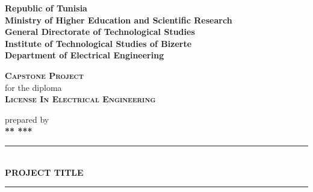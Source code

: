 \begin{titlepage}
    \newcommand{\HRule}{\rule{\linewidth}{0.35mm}}
    \begin{flushleft}
        {\scriptsize
            \textbf{\large{Republic of Tunisia}}\\
            \textbf{\large{Ministry of Higher Education and Scientific Research}}\\
            \textbf{\large{General Directorate of Technological Studies}}\\
            \textbf{\large{Institute of Technological Studies of Bizerte}}\\
            \textbf{\large{Department of Electrical Engineering}}}
    \end{flushleft}
    \begin{center}
        \textbf{\textsc{\huge{Capstone Project}}}\\
        for the diploma\\
        \textbf{\textsc{\large{License In Electrical Engineering}}}\\
    \end{center}
    \begin{center}
        prepared by\\
        \textbf{{\large *** \textsc{***}}}\\
    \end{center}
    \begin{center}
        \HRule \\[0.3cm]
        \Huge{\textbf{PROJECT TITLE}}\\[0.2cm]
        \HRule \\%

\end{center}
\end{titlepage}
